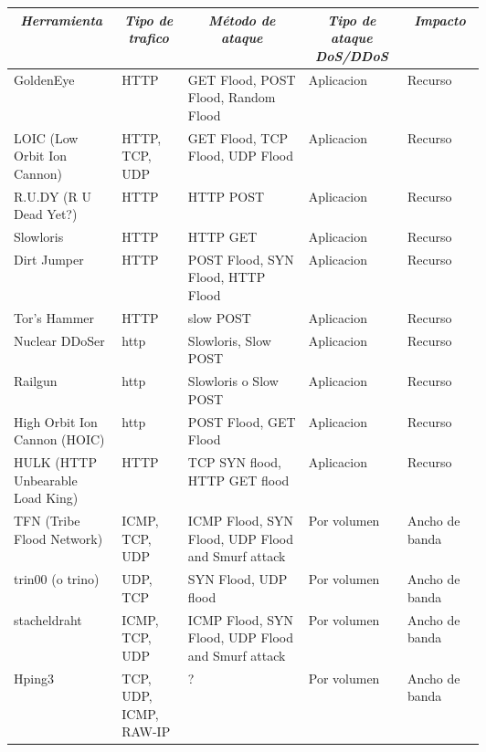 \documentclass[12pt]{article}
\begin{document}
\begin{table}[htbp]
\tiny
\centering
\begin{tabular}{|p{0.1\linewidth}|p{0.1\linewidth}|p{0.2\linewidth}|p{0.1\linewidth}|p{0.1\linewidth}|}\hline
\multicolumn{1}{|c|}{\textit{\textbf{Herramienta}}} & 
\multicolumn{1}{c|}{\textit{\textbf{Tipo de trafico}}} &
\multicolumn{1}{|c|}{\textit{\textbf{Método de ataque}}} & 
\multicolumn{1}{|c|}{\textit{\textbf{Tipo de ataque DoS/DDoS}}} &
\multicolumn{1}{|c|}{\textit{\textbf{Impacto}}} \tabularnewline \hline

GoldenEye &
HTTP & 
GET Flood, POST Flood, Random Flood  & 
Aplicacion & 
Recurso
\tabularnewline \hline

LOIC (Low Orbit Ion Cannon) &
HTTP, TCP, UDP & 
GET Flood, TCP Flood, UDP Flood  & 
Aplicacion & 
Recurso
\tabularnewline \hline

R.U.DY (R U Dead Yet?) &
HTTP & 
HTTP POST  & 
Aplicacion & 
Recurso
\tabularnewline \hline

Slowloris &
HTTP & 
HTTP GET   & 
Aplicacion & 
Recurso
\tabularnewline \hline

Dirt Jumper &
HTTP & 
POST Flood, SYN Flood, HTTP Flood & 
Aplicacion & 
Recurso
\tabularnewline \hline

Tor’s Hammer &
HTTP & 
slow POST & 
Aplicacion & 
Recurso
\tabularnewline \hline

Nuclear DDoSer &
http & 
Slowloris, Slow POST & 
Aplicacion & 
Recurso
\tabularnewline \hline

Railgun &
http & 
Slowloris o Slow POST & 
Aplicacion & 
Recurso
\tabularnewline \hline

High Orbit Ion Cannon (HOIC) &
http & 
POST Flood, GET Flood & 
Aplicacion & 
Recurso
\tabularnewline \hline

HULK (HTTP Unbearable Load King) &
HTTP & 
TCP SYN flood, HTTP GET flood & 
Aplicacion & 
Recurso
\tabularnewline \hline

TFN (Tribe Flood Network) &
ICMP, TCP, UDP & 
ICMP Flood, SYN Flood, UDP Flood and Smurf attack & 
Por volumen & 
Ancho de banda
\tabularnewline \hline

trin00 (o trino) &
UDP, TCP & 
SYN Flood, UDP flood & 
Por volumen & 
Ancho de banda
\tabularnewline \hline

stacheldraht &
ICMP, TCP, UDP & 
ICMP Flood, SYN Flood, UDP Flood and Smurf attack & 
Por volumen & 
Ancho de banda
\tabularnewline \hline

Hping3 &
TCP, UDP, ICMP, RAW-IP & 
? & 
Por volumen & 
Ancho de banda
\tabularnewline \hline


\end{tabular}
\end{table}
\end{document}
